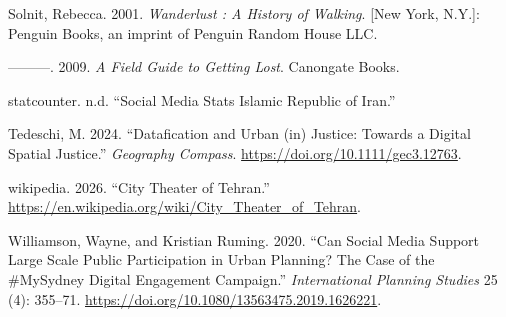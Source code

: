\documentclass[
  letterpaper,
  DIV=11,
  numbers=noendperiod]{scrartcl}
\newlength{\cslhangindent}
\newenvironment{CSLReferences}[2] %
 {\begin{list}{}{%
  \setlength{\itemindent}{0pt}
  \setlength{\leftmargin}{0pt}
  \setlength{\parsep}{0pt}
  \ifodd #1
   \setlength{\leftmargin}{\cslhangindent}
   \setlength{\itemindent}{-1\cslhangindent}
  \fi
  \setlength{\itemsep}{#2\baselineskip}}}
 {\end{list}}
\begin{document}
\begin{CSLReferences}{1}{0}
Solnit, Rebecca. 2001. \emph{Wanderlust : A History of Walking}. {[}New
York, N.Y.{]}: Penguin Books, an imprint of Penguin Random House LLC.

---------. 2009. \emph{A Field Guide to Getting Lost}. Canongate Books.

statcounter. n.d. {``Social Media Stats Islamic Republic of Iran.''}

Tedeschi, M. 2024. {``Datafication and Urban (in) Justice: Towards a
Digital Spatial Justice.''} \emph{Geography Compass}.
\url{https://doi.org/10.1111/gec3.12763}.

wikipedia. 2026. {``City Theater of Tehran.''}
\url{https://en.wikipedia.org/wiki/City_Theater_of_Tehran}.

Williamson, Wayne, and Kristian Ruming. 2020. {``Can Social Media
Support Large Scale Public Participation in Urban Planning? The Case of
the {\#}MySydney Digital Engagement Campaign.''} \emph{International
Planning Studies} 25 (4): 355--71.
\url{https://doi.org/10.1080/13563475.2019.1626221}.

\end{CSLReferences}
\end{document}
